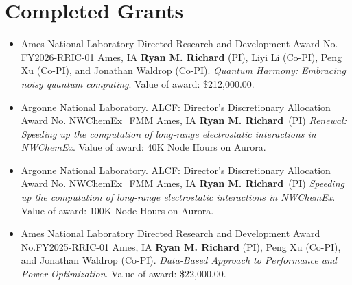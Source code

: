 \section{Completed Grants}
\vspace{5pt}
\begin{itemize}
		\item{
		{Ames National Laboratory Directed Research and Development}
		{Award No. FY2026-RRIC-01}
		{Ames, IA}
		{}
		{\textbf{Ryan M. Richard} (PI), Liyi Li (Co-PI), Peng Xu (Co-PI), 
		 and Jonathan Waldrop (Co-PI).  
		 \textit{Quantum Harmony: Embracing noisy quantum computing}.
		 Value of award: \$212,000.00.
		}
	}
	\item{
		  {Argonne National Laboratory. ALCF: Director's Discretionary 
		   Allocation}
	         {Award No. NWChemEx\_FMM}
	         {Ames, IA}
	         {}
	         {\textbf{Ryan M. Richard}\ (PI) 
			  \textit{Renewal: Speeding up the computation of long-range 
			          electrostatic interactions in NWChemEx}.
	          Value of award: 40K Node Hours on Aurora.
			 }
	        
	}
	\item{
		     {Argonne National Laboratory. ALCF: Director's Discretionary 
			 Allocation}
	         {Award No. NWChemEx\_FMM}
	         {Ames, IA}
	         {}
	         {\textbf{Ryan M. Richard}\ (PI) 
			  \textit{Speeding up the computation of long-range 
			          electrostatic interactions in NWChemEx}.
	          Value of award: 100K Node Hours on Aurora.
			 }
	        
	}
	\item{
		{Ames National Laboratory Directed Research and Development}
		{Award No.FY2025-RRIC-01}
		{Ames, IA}
		{}
		{\textbf{Ryan M. Richard} (PI), Peng Xu (Co-PI), 
		 and Jonathan Waldrop (Co-PI).  
		 \textit{Data-Based Approach to Performance and Power Optimization}. 
		 Value of award: \$22,000.00.
		}
	}


\end{itemize}
